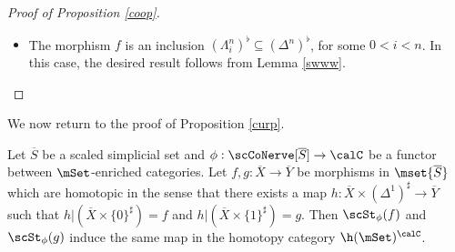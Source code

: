 \begin{proof}[Proof of Proposition \ref{coop}]
\begin{itemize}
For the map $i_{2n}$, we need to work a bit harder. Let $\gamma$
denote the $2$-simplex of $\Delta^n \times \Delta^1$ spanned by the chain of vertices
$(0,0) < (1,1) < (n,1)$, and let $\gamma'$ denote the $2$-simplex spanned by the chain of vertices
$(0,0) < (1,0) < (n,1)$. We have a commutative diagram
$$ \xymatrix{ (Z_{2n-1}, T_{2n-1}) \coprod_{ ( \Delta^n \times \{0\} )_{\flat} } \{v\}_{\flat} 
\ar[r]^{i_{2n}} \ar[d] & (\Delta^n \times \Delta^1, T) \coprod_{ ( \Delta^n \times \{0\})_{\flat} } \{v\}_{\flat} \ar[d] \\
( Z_{2n-1}, T \cup \{ \gamma, \gamma' \} ) \coprod_{ ( \Delta^n \times \{0\} )_{\flat} } \{v\}_{\flat} \ar[r]^{i'} & (\Delta^n \times \Delta^1, T \cup \{ \gamma, \gamma' \} ) \coprod_{ ( \Delta^n \times \{0\})_{\flat} } \{v\}_{\flat} .}$$
The vertical maps are scaled anodyne (each can be obtained as a pushout of two of the morphisms
appearing in Remark \ref{slapperB}), and therefore bicategorical equivalences.
It follows that $i_{n}$ is a bicategorical equivalence if and only if $i'$ is a bicategorical equivalence.
We now complete the proof by observing that $i'$ is a pushout of the bicategorical equivalence
appearing in Lemma \ref{prewise}.

\item[$(C_1)$]  The morphism $f$ is an inclusion $(\Lambda^n_i)^{\flat} \subseteq (\Delta^n)^{\flat}$, for some $0 < i < n$. In this case, the desired result follows from Lemma \ref{swww}.
\end{itemize}

\end{proof}


We now return to the proof of Proposition \ref{curp}.

\begin{lemma}\label{corp1}
Let $\overline{S}$ be a scaled simplicial set and $\phi: \scCoNerve[\overline{S}] \rightarrow \calC$ be a functor between $\mSet$-enriched categories. Let $f,g: \overline{X} \rightarrow \overline{Y}$ be morphisms in $\mset{\overline{S}}$ which are homotopic in the sense that there exists a map
$h: \overline{X} \times (\Delta^1)^{\sharp} \rightarrow \overline{Y}$ such that
$h | (\overline{X} \times \{0\}^{\sharp}) = f$ and $h | ( \overline{X} \times \{1\}^{\sharp}) = g$.
Then $\scSt_{\phi}(f)$ and $\scSt_{\phi}(g)$ induce the same map in the homotopy category
$\h(\mSet)^{\calC}$. 
\end{lemma}

